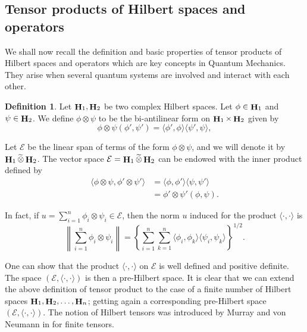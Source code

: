 \documentclass[a4paper,12pt,reqno]{amsart}
\theoremstyle{definition}
\newtheorem{defn}[thm]{Definition}
\theoremstyle{remark}
\numberwithin{equation}{section}
\DeclareMathOperator{\Tr}{Tr}
\DeclareMathOperator{\Hi}{{\bf H}}
\begin{document}


\subsection{Tensor products of Hilbert spaces and operators}
We shall now recall the definition and basic properties of tensor products of Hilbert spaces and operators which are key concepts in Quantum Mechanics. They arise when several quantum systems are involved and interact with each other. 

\begin{defn}
	Let $\Hi_1, \Hi_2$ be  two complex  Hilbert spaces. Let $\phi\in \Hi_1$ and $\psi\in \Hi_2$. We define 
	 $\phi\otimes\psi$ to be the bi-antilinear form on $ \Hi_1\times \Hi_2$ given by 
	 \[\phi\otimes\psi(\phi',\psi')=\langle \phi',\phi \rangle\langle \psi',\psi \rangle ,\]%



\vspace{0.5cm}

 
	Let $\mathcal{E}$ be the linear span of terms of the form $\phi\otimes\psi$, and we will denote it by $ \Hi_1\widetilde{\otimes} \Hi_2$. The vector space $\mathcal{E}=\Hi_1\widetilde{\otimes} \Hi_2$ can be endowed with the inner product  defined by 
	\begin{align*}\langle \phi\otimes\psi, \phi'\otimes\psi'\rangle&=\langle \phi,\phi' \rangle\langle \psi,\psi' \rangle\\
	&= \phi'\otimes\psi'(\phi,\psi).
		\end{align*}
  
In fact, if $u=\sum\limits_{i=1}^n \phi_i \otimes \psi_i \in \mathcal{E}$, then the norm $u$ induced for the product $\langle \cdot, \cdot\rangle$ is
\[\left\|\sum\limits_{i=1}^n \phi_i \otimes \psi_i\right\|=\left\{\sum\limits_{i=1}^n\sum\limits_{k=1}^n \langle \phi_i,\phi_k \rangle\langle \psi_i,\psi_k \rangle\right\}^{1/2}.\]
 
\end{defn}
One can show that the product $\langle \cdot, \cdot\rangle$ on $\mathcal{E}$ is well defined and positive definite.
 The space $(\mathcal{E}, \langle \cdot, \cdot\rangle)$ is then a pre-Hilbert space. 
  It is clear that we can extend the above definition of tensor product  to the case of a finite number of Hilbert spaces $\Hi_1, \Hi_2,\dots, \Hi_n$; getting again a  corresponding pre-Hilbert space  $(\mathcal{E}, \langle \cdot, \cdot\rangle)$.    
  The notion of Hilbert tensors was introduced by Murray and von Neumann in \cite{Murray} for finite tensors. 
\end{document}
